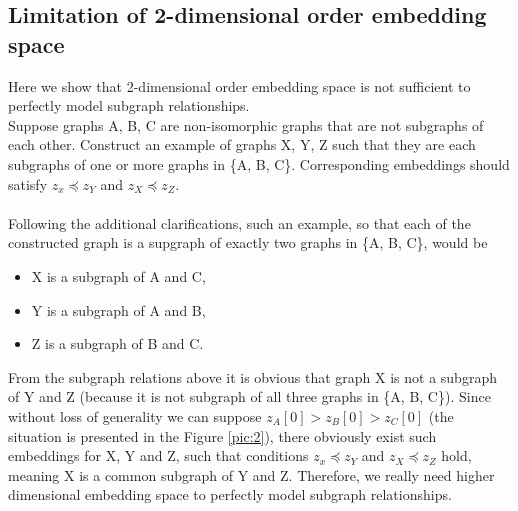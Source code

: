 \documentclass[a4paper,11pt]{article}
\begin{document}
\subsection{Limitation of 2-dimensional order embedding space}
Here we show that 2-dimensional order embedding space is not sufficient to perfectly model subgraph relationships.
\\
Suppose graphs A, B, C are non-isomorphic graphs that are not subgraphs of each other. Construct an example of graphs X, Y, Z such that they are each subgraphs of one or more graphs in \{A, B, C\}. Corresponding embeddings should satisfy $z_x \preceq z_Y$ and $z_X \preceq z_Z$.
\\
\\
Following the additional clarifications, such an example, so that each of the constructed graph is a supgraph of exactly two graphs in \{A, B, C\}, would be 
\begin{itemize}
    \item X is a subgraph of A and C,
    \item Y is a subgraph of A and B,
    \item Z is a subgraph of B and C.
\end{itemize}
From the subgraph relations above it is obvious that graph X is not a subgraph of Y and Z (because it is not subgraph of all three graphs in \{A, B, C\}).
Since without loss of generality we can suppose $z_A[0] > z_B[0] > z_C[0]$ (the situation is presented in the Figure \ref{pic:2}), there obviously exist such embeddings for X, Y and Z, such that conditions $z_x \preceq z_Y$ and $z_X \preceq z_Z$ hold, meaning X is a common subgraph of Y and Z.
Therefore, we really need higher dimensional embedding space to perfectly model subgraph relationships.

\end{document}
